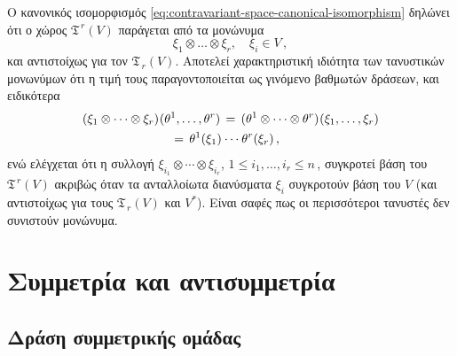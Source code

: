 \documentclass[11pt,a4paper,twoside,openright]{book}
\begin{document}
Ο κανονικός ισομορφισμός \eqref{eq:contravariant-space-canonical-isomorphism} δηλώνει ότι
ο χώρος $\mathfrak{T}^{\,r}(V)$ παράγεται από τα μονώνυμα
\begin{equation*}
\xi_1 \otimes \dots \otimes \xi_r,
\quad
\xi_i \in V\,,
\end{equation*}
και αντιστοίχως για τον $\mathfrak{T}_{\,r}(V)$. Aποτελεί χαρακτηριστική ιδιότητα
των τανυστικών μονωνύμων ότι η τιμή τους παραγοντοποιείται ως γινόμενο βαθμωτών δράσεων, και ειδικότερα
\begin{equation}\label{eq:tensor-mononyms-property}
\begin{split}
(\xi_1 \otimes \dots \otimes \xi_r)\hspace{.5pt}(\theta^1, \dots, \theta^r)
\,&=\,
(\theta^1 \otimes \dots \otimes \theta^r)\hspace{.5pt}(\xi_1, \dots, \xi_r)\\
\,=\,
\theta^1(\xi_1)\hspace{.5pt} &\cdots \hspace{.5pt}\theta^r(\xi_r)\,,
\end{split}
\end{equation}
ενώ ελέγχεται ότι η συλλογή
$\xi_{i_1} \otimes \cdots \otimes \xi_{i_r}$,
$1 \le i_1, \dots, i_r \le n\,$,
συγκροτεί βάση του $\mathfrak{T}^{\,r}(V)$
ακριβώς όταν τα ανταλλοίωτα διανύσματα $\xi_i$
συγκροτούν βάση του $V$ (και αντιστοίχως για τους $\mathfrak{T}_{\,r}(V)$ και $V^*$). Είναι σαφές πως οι περισσότεροι τανυστές δεν συνιστούν μονώνυμα.

\section{Συμμετρία και αντισυμμετρία}
	\label{sec:symmetry-and-antisymmetry}

\subsection{Δράση συμμετρικής ομάδας}
	\label{seq:symmetric-group-action}
\end{document}
